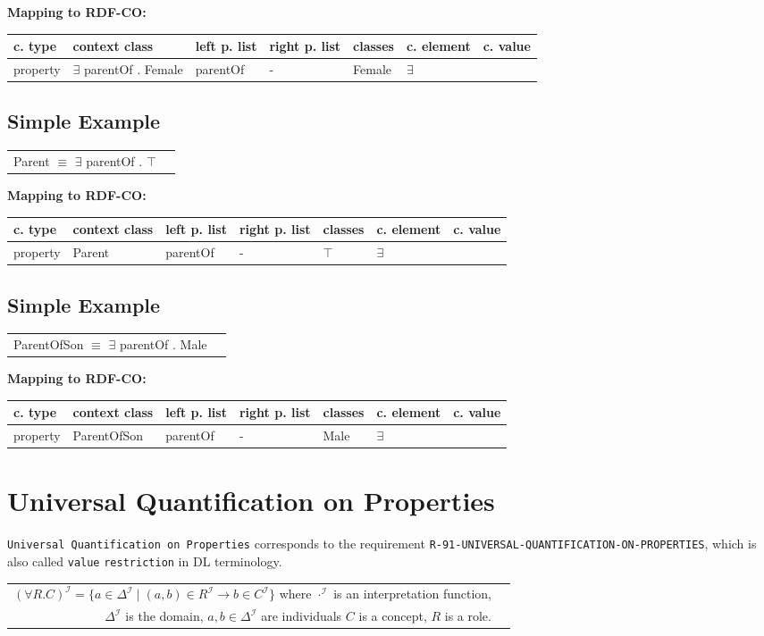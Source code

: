 \documentclass{llncs}
\newcommand{\ms}[1]{\texttt{#1}}
\newenvironment{gcotable}{
  \scriptsize
  \sffamily
  \vspace{0cm}
	\begin{center}
	\textbf{\vspace{0.4cm}Mapping to RDF-CO:} \\
  \begin{tabular}{l|l|l|l|l|l|l}
	\hline
  \textbf{c. type} & \textbf{context class} & \textbf{left p. list} & \textbf{right p. list} & \textbf{classes} & \textbf{c. element} & \textbf{c. value} \\
  \hline

}{
  \hline
  \end{tabular}
	\end{center}
}
\newenvironment{DL}{
  \vspace{0cm}
	\begin{center}
  \begin{tabular}{r l}

}{
  \end{tabular}
	\end{center}
}
\begin{document}
\begin{gcotable}
property & $\exists$ parentOf . Female & parentOf & - & Female & $\exists$ \\
\end{gcotable}

\subsection{Simple Example}

\begin{DL}
Parent $\equiv$ $\exists$ parentOf . $\top$
\end{DL}

\begin{gcotable}
property & Parent & parentOf & - & $\top$ & $\exists$ \\
\end{gcotable}

\subsection{Simple Example}

\begin{DL}
ParentOfSon $\equiv$ $\exists$ parentOf . Male
\end{DL}

\begin{gcotable}
property & ParentOfSon & parentOf & - & Male & $\exists$ \\
\end{gcotable}

\section{Universal Quantification on Properties}

\ms{Universal Quantification on Properties} corresponds to the requirement \ms{R-91-UNIVERSAL-QUANTIFICATION-ON-PROPERTIES}, 
which is also called \ms{value} \ms{restriction} in DL terminology.

\begin{center}
\begin{DL} 
$(\forall R.C)^\mathcal{I}= \{a \in \Delta^\mathcal{I}\mid (a,b) \in R^\mathcal{I} \rightarrow b \in C^\mathcal{I} \}$ where $\cdot^\mathcal{I}$ is an interpretation function, \\
$\Delta^\mathcal{I}$ is the domain, $a,b \in \Delta^\mathcal{I}$ are individuals $C$ is a concept, $R$ is a role. 
\end{DL}
\end{center}
\end{document}
